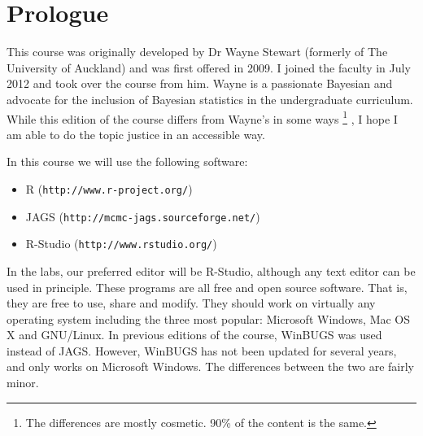 \section{Prologue}
This course was originally developed by Dr Wayne Stewart (formerly of The
University of
Auckland) and was first offered in 2009. I joined the faculty in July 2012
and took over the course from him. Wayne is a passionate Bayesian and advocate
for the inclusion of Bayesian statistics in the undergraduate curriculum.
While this edition of the course differs from Wayne's in some ways
\footnote{The differences are mostly cosmetic. 90\% of the content is the same.}
, I hope I am able to do the topic justice in an accessible way.

In this course we will use the following software:
\begin{itemize}
\item R ({\tt http://www.r-project.org/}) \\
\item JAGS ({\tt http://mcmc-jags.sourceforge.net/}) \\
\item R-Studio ({\tt http://www.rstudio.org/})
\end{itemize}
In the labs, our preferred editor will be R-Studio, although any text editor
can be used in principle. These programs are all free and open source software.
That is, they are free to use, share and modify. They should work on
virtually any operating system including the three most popular:
Microsoft Windows, Mac OS X and GNU/Linux. In previous editions of the course,
WinBUGS was used instead of JAGS. However, WinBUGS has not been updated for
several years, and only works on Microsoft Windows. The differences between
the two are fairly minor.
